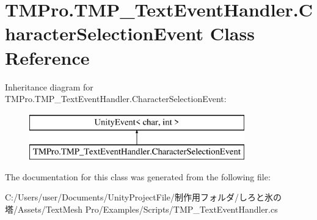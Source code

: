 \hypertarget{class_t_m_pro_1_1_t_m_p___text_event_handler_1_1_character_selection_event}{}\section{T\+M\+Pro.\+T\+M\+P\+\_\+\+Text\+Event\+Handler.\+Character\+Selection\+Event Class Reference}
\label{class_t_m_pro_1_1_t_m_p___text_event_handler_1_1_character_selection_event}
Inheritance diagram for T\+M\+Pro.\+T\+M\+P\+\_\+\+Text\+Event\+Handler.\+Character\+Selection\+Event\+:\begin{figure}[H]
\begin{center}
\leavevmode
\includegraphics[height=2.000000cm]{class_t_m_pro_1_1_t_m_p___text_event_handler_1_1_character_selection_event}
\end{center}
\end{figure}


The documentation for this class was generated from the following file\+:\begin{DoxyCompactItemize}
\item 
C\+:/\+Users/user/\+Documents/\+Unity\+Project\+File/制作用フォルダ/しろと氷の塔/\+Assets/\+Text\+Mesh Pro/\+Examples/\+Scripts/T\+M\+P\+\_\+\+Text\+Event\+Handler.\+cs\end{DoxyCompactItemize}
